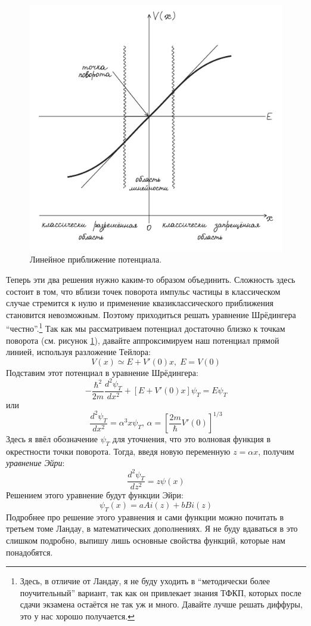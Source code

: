 \begin{figure}[ht]
\centering
\includegraphics[scale=0.28]{class_11/images/turning-point.jpg}
\caption{Линейное приближение потенциала.}
\label{fig 11.2}
\end{figure}

Теперь эти два решения нужно каким-то образом объединить. Сложность здесь состоит в том, что вблизи точек поворота импульс частицы в классическом случае стремится к нулю и применение квазиклассического приближения становится невозможным. Поэтому приходиться решать уравнение Шрёдингера ``честно''.\footnote{Здесь, в отличие от Ландау, я не буду уходить в ``методически более поучительный'' вариант, так как он привлекает знания ТФКП, которых после сдачи экзамена остаётся не так уж и много. Давайте лучше решать диффуры, это у нас хорошо получается.} Так как мы рассматриваем потенциал достаточно близко к точкам поворота (см. рисунок \ref{fig 11.2}), давайте аппроксимируем наш потенциал прямой линией, используя разложение Тейлора:
\[
V(x) \simeq E + V'(0)x,\; E = V(0)
\]
Подставим этот потенциал в уравнение Шрёдингера:
\[
-\frac{\hbar^2}{2m}\frac{d^2 \psi_T}{dx^2} + [E + V'(0)x]\psi_T = E\psi_T
\]
или
\[
\frac{d^2 \psi_T}{dx^2} = \alpha^3 x \psi_T, \, \alpha = \left[ \frac{2m}{\hbar} V'(0) \right]^{1/3}
\]
Здесь я ввёл обозначение $\psi_T$ для уточнения, что это волновая функция в окрестности точки поворота. Тогда, введя новую переменную $z = \alpha x$, получим \textit{уравнение Эйри}:
\[
\frac{d^2 \psi_T}{dz^2} = z\psi(x)
\]
Решением этого уравнение будут функции Эйри:
\[
\psi_T(x) = aAi(z) + bBi(z)
\]
Подробнее про решение этого уравнения и сами функции можно почитать в третьем томе Ландау, в математических дополнениях. Я не буду вдаваться в это слишком подробно, выпишу лишь основные свойства функций, которые нам понадобятся.

